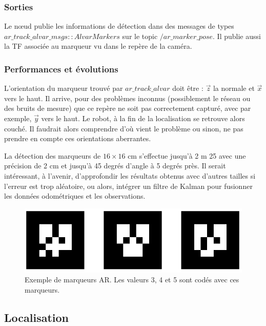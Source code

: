 \documentclass[10pt,a4paper]{article}
\begin{document}
\subsubsection{Sorties}

Le nœud publie les informations de détection dans des messages de types $ar\_track\_alvar\_msgs::AlvarMarkers$ sur le topic $/ar\_marker\_pose$. Il publie aussi la TF associée au marqueur vu dans le repère de la caméra.
	
\subsubsection{Performances et évolutions}

L'orientation du marqueur trouvé par $ar\_track\_alvar$ doit être : $\vec{z}$ la normale et $\vec{x}$ vers le haut. Il arrive, pour des problèmes inconnus (possiblement le réseau ou des bruits de mesure) que ce repère ne soit pas correctement capturé, avec par exemple, $\vec{y}$ vers le haut. Le robot, à la fin de la localisation se retrouve alors couché. Il faudrait alors comprendre d'où vient le problème ou sinon, ne pas prendre en compte ces orientations aberrantes. 
	
La détection des marqueurs de $16 \times 16$ cm s'effectue jusqu'à 2 m 25 avec une précision de 2 cm et jusqu'à 45 degrés d'angle à 5 degrés près. Il serait intéressant, à l'avenir, d'approfondir les résultats obtenus avec d'autres tailles si l'erreur est trop aléatoire, ou alors, intégrer un filtre de Kalman pour fusionner les données odométriques et les observations.

\begin{figure}
\center
\includegraphics[scale=0.6]{figures/artags.png} 
\caption{Exemple de marqueurs AR. Les valeurs 3, 4 et 5 sont codés avec ces marqueurs.}	
\end{figure}


\subsection{Localisation}
\label{sec:localision}
\end{document}
